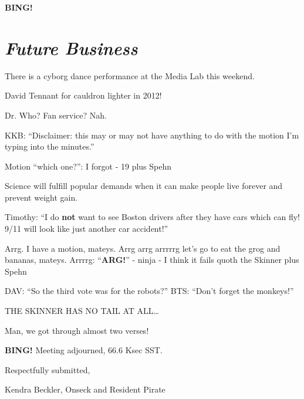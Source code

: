\documentclass[10pt]{article}
\newcommand{\bing}{{\bf BING!} }
\newcommand{\goto}[1]{\bing \vskip 12pt \section*{{\em{#1}}}}
\newcommand{\ps}{ plus Spehn\xspace}
\newcommand{\onseck}{Kendra Beckler, Onseck and Resident Pirate}
\begin{document}
\goto{Future Business}

There is a cyborg dance performance at the Media Lab this weekend.

David Tennant for cauldron lighter in 2012!

Dr. Who?  Fan service?  Nah.

KKB: ``Disclaimer: this may or may not have anything to do with the motion I'm typing into the minutes.''

Motion ``which one?'': I forgot - 19 \ps

Science will fulfill popular demands when it can make people live forever and prevent weight gain.

Timothy: ``I do \textbf{not} want to see Boston drivers after they have cars which can fly!  9/11 will look like just another car accident!''

Arrg.  I have a motion, mateys.  Arrg arrg arrrrrg let's go to eat the grog and bananas, mateys.  Arrrrg: ``\textbf{ARG!}'' - ninja - I think it fails quoth the Skinner \ps

DAV: ``So the third vote was for the robots?''
BTS: ``Don't forget the monkeys!''

THE SKINNER HAS NO TAIL AT ALL\ldots

Man, we got through almost two verses!

\bing
\noindent
Meeting adjourned, 66.6 Ksec SST.

\vspace{18pt}

\centerline{Respectfully submitted,}
\centerline{\onseck}
\end{document}
